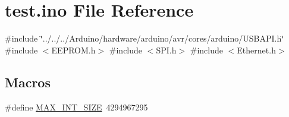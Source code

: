 \hypertarget{test_8ino}{}\section{test.\+ino File Reference}
\label{test_8ino}
{\ttfamily \#include \char`\"{}../../../\+Arduino/hardware/arduino/avr/cores/arduino/\+U\+S\+B\+A\+P\+I.\+h\char`\"{}}\newline
{\ttfamily \#include $<$E\+E\+P\+R\+O\+M.\+h$>$}\newline
{\ttfamily \#include $<$S\+P\+I.\+h$>$}\newline
{\ttfamily \#include $<$Ethernet.\+h$>$}\newline
\subsection*{Macros}
\begin{DoxyCompactItemize}
\item 
\#define \mbox{\hyperlink{test_8ino_a774a906ceb2672aee07483be36134011}{M\+A\+X\+\_\+\+I\+N\+T\+\_\+\+S\+I\+ZE}}~4294967295
\end{DoxyCompactItemize}
